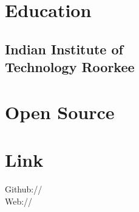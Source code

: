 \documentclass[]{deedy-resume-openfont}
\begin{document}
\begin{minipage}[t]{0.33\textwidth}


\section{Education}


\subsection{Indian Institute of \\ Technology Roorkee}
\sectionsep


\section{Open Source}
    \textbullet{} \href{https://github.com/sympy/sympy}{} \textbullet{} \href{https://fluxml.ai/Flux.jl}{} \textbullet{} \href{http://scikit-learn.org/}{} \textbullet{} \href{http://mpmath.org/}{} \textbullet{} \href{https://www.libreoffice.org}{}


\section{Link}
Github:// \href{https://github.com/gxyd}{} \\
Web:// \href{https://gxyd.github.io}{} \\
\sectionsep


\end{minipage}
\end{document}
